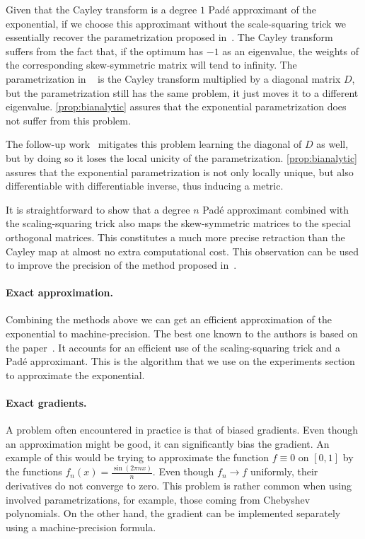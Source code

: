 \begin{remark}\label{remark:cayley}
    Given that the Cayley transform is a degree $1$ Pad\'e approximant of the exponential, if we choose this approximant without the scale-squaring trick we essentially recover the parametrization proposed in~\cite{helfrich18a}. The Cayley transform suffers from the fact that, if the optimum has $-1$ as an eigenvalue, the weights of the corresponding skew-symmetric matrix will tend to infinity. The parametrization in ~\cite{helfrich18a} is the Cayley transform multiplied by a diagonal matrix $D$, but the parametrization still has the same problem, it just moves it to a different eigenvalue. \ref{prop:bianalytic} assures that the exponential parametrization does not suffer from this problem.

    The follow-up work~\cite{maduranga2018complexur} mitigates this problem learning the diagonal of $D$ as well, but by doing so it loses the local unicity of the parametrization. \ref{prop:bianalytic} assures that the exponential parametrization is not only locally unique, but also differentiable with differentiable inverse, thus inducing a metric.
\end{remark}

\begin{remark}
    It is straightforward to show that a degree $n$ Pad\'e approximant combined with the scaling-squaring trick also maps the skew-symmetric matrices to the special orthogonal matrices. This constitutes a much more precise retraction than the Cayley map at almost no extra computational cost. This observation can be used to improve the precision of the method proposed in~\cite{wisdom2016full,vorontsov2017orthogonality}.
\end{remark}

\paragraph{Exact approximation.} Combining the methods above we can get an efficient approximation of the exponential to machine-precision. The best one known to the authors is based on the paper~\cite{al2009new}. It accounts for an efficient use of the scaling-squaring trick and a Pad\'e approximant. This is the algorithm that we use on the experiments section to approximate the exponential.

\paragraph{Exact gradients.} A problem often encountered in practice is that of biased gradients. Even though an approximation might be good, it can significantly bias the gradient. An example of this would be trying to approximate the function $f \equiv 0$ on $[0, 1]$ by the functions $f_n(x) = \frac{\sin(2\pi nx)}{n}$. Even though $f_n \to f$ uniformly, their derivatives do not converge to zero. This problem is rather common when using involved parametrizations, for example, those coming from Chebyshev polynomials. On the other hand, the gradient can be implemented separately using a machine-precision formula.

